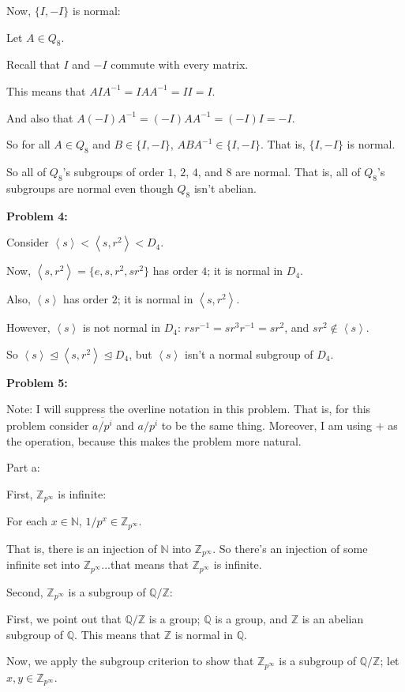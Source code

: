 \documentclass[a4paper,12pt]{article}
\newcommand{\tab}{\hspace{4mm}} %
\newcommand{\shunt}{\vspace{20mm}}
\newcommand{\anbrack}[1]{\left\langle #1 \right\rangle}
\newcommand{\N}{\mathbb{N}}
\newcommand{\Q}{\mathbb{Q}}
\newcommand{\Z}{\mathbb{Z}}
\newcommand{\subgp}{\mathrel{\unlhd}}
\begin{document}
Now, $\{I, -I\}$ is normal:

Let $A \in Q_8$.

Recall that $I$ and $-I$ commute with every matrix.

This means that $AIA^{-1} = IAA^{-1} = II=I$.

And also that $A(-I)A^{-1} = (-I)AA^{-1} = (-I)I=-I$.

So for all $A \in Q_8$ and $B \in \{I, -I\}$, $ABA^{-1} \in \{I, -I\}$. That is, $\{I, -I\}$ is normal.

So all of $Q_8$'s subgroups of order $1$, $2$, $4$, and $8$ are normal. That is, all of $Q_8$'s subgroups are normal even though $Q_8$ isn't abelian.

\shunt

{\bf Problem 4:}

Consider $\anbrack{s} < \anbrack{s,r^2} < D_4$.

Now, $\anbrack{s,r^2} = \{e,s,r^2,sr^2\}$ has order $4$; it is normal in $D_4$.

Also, $\anbrack{s}$ has order $2$; it is normal in $\anbrack{s,r^2}$.

However, $\anbrack{s}$ is not normal in $D_4$: $rsr^{-1} = sr^3r^{-1}=sr^2$, and $sr^2 \notin \anbrack{s}$.

So $\anbrack{s} \subgp \anbrack{s,r^2} \subgp D_4$, but $\anbrack{s}$ isn't a normal subgroup of $D_4$.

\shunt

{\bf Problem 5:}

Note: I will suppress the overline notation in this problem. That is, for this problem consider $\overline{a/p^i}$ and $a/p^i$ to be the same thing. Moreover, I am using $+$ as the operation, because this makes the problem more natural.

Part a:

First, $\Z_{p^\infty}$ is infinite: 

\tab For each $x \in \N$, $1/p^x \in \Z_{p^\infty}$.

\tab That is, there is an injection of $\N$ into $\Z_{p^\infty}$. So there's an injection of some infinite set into $\Z_{p^\infty}$...that means that $\Z_{p^\infty}$ is infinite.

Second, $\Z_{p^\infty}$ is a subgroup of $\Q/\Z$:

\tab First, we point out that $\Q/\Z$ is a group; $\Q$ is a group, and $\Z$ is an abelian subgroup of $\Q$. This means that $\Z$ is normal in $\Q$.

\tab Now, we apply the subgroup criterion to show that $\Z_{p^\infty}$ is a subgroup of $\Q/\Z$; let $x, y \in \Z_{p^\infty}$. 
\end{document}
